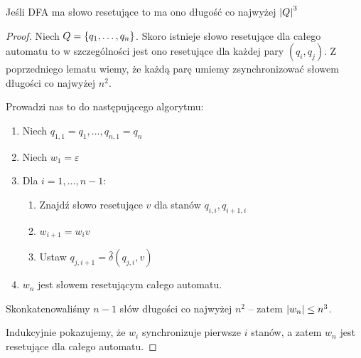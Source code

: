\begin{theorem}
	Jeśli DFA ma słowo resetujące to ma ono długość co najwyżej \( \card{Q}^3 \)
\end{theorem}
\begin{proof}
	Niech \( Q = \set{q_1, \dots, q_n} \).
	Skoro istnieje słowo resetujące dla całego automatu to w szczególności jest ono resetujące dla każdej pary \( (q_i, q_j) \). Z poprzedniego lematu wiemy, że każdą parę umiemy zsynchronizować słowem długości co najwyżej \( n^2 \).

	Prowadzi nas to do następującego algorytmu:
	\begin{enumerate}
		\item Niech \( q_{1, 1} = q_1, \dots, q_{n, 1} = q_n \)
		\item Niech \( w_1 = \varepsilon \)
		\item Dla \( i = 1, \dots, n - 1 \):
		      \begin{enumerate}
			      \item Znajdź słowo resetujące \( v \) dla stanów \( q_{i, i}, q_{i + 1, i} \)
			      \item \( w_{i + 1} = w_iv \)
			      \item Ustaw \( q_{j, i + 1} = \widehat \delta(q_{j, i}, v) \)
		      \end{enumerate}
		\item \( w_n \) jest słowem resetującym całego automatu.
	\end{enumerate}

	Skonkatenowaliśmy \( n - 1 \) słów długości co najwyżej \( n^2 \) -- zatem \( \card{w_n} \leq n^3 \).

	Indukcyjnie pokazujemy, że \( w_i \) synchronizuje pierwsze \( i \) stanów, a zatem \( w_n \) jest resetujące dla całego automatu.

\end{proof}
